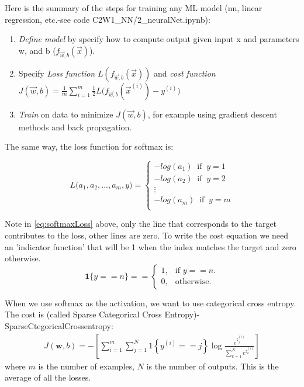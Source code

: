 \documentclass[12pt]{report}
\begin{document}
Here is the summary of the steps for training any ML model (nn, linear regression, etc.-see code C2W1\_NN/2\_neuralNet.ipynb):
\begin{enumerate}
  \item \textit{Define model} by specify how to compute output given input x and parameters w, and b ($f_{\overrightarrow{w},b} (\overrightarrow{x})$).
  \item Specify \textit{Loss function} $L (f_{\overrightarrow{w},b} (\overrightarrow{x}) )  $ and \textit{cost function} $J(\overrightarrow{w},b) = \frac{1}{m} \sum_{i=1}^{m} \frac{1}{2}  L\big(f_{\overrightarrow{w},b} (\overrightarrow{x}^{(i)}) - y^{(i)} \big)$
  \item \textit{Train} on data to minimize $J(\overrightarrow{w},b)$, for example using gradient descent methods and back propagation.
\end{enumerate}

The same way, the loss function for softmax is:

\begin{equation}
  L\big( a_1, a_2, ..., a_m, y \big) =
  \begin{cases}
    -log ( a_1 )  \;\; \text{if} \;\; y = 1  \\
    -log ( a_2 )  \;\; \text{if} \;\; y = 2  \\
    \vdots\\
    -log ( a_m )  \;\; \text{if} \;\; y = m  \\
  \end{cases}
  \label{eq:softmaxLoss}
\end{equation}

Note in \ref{eq:softmaxLoss} above, only the line that corresponds to the target contributes to the loss, other lines are zero. To write the cost equation we need an 'indicator function' that will be 1 when the index matches the target and zero otherwise.
$$\mathbf{1}\{y == n\} = =\begin{cases}
  1, & \text{if $y==n$}.\\
  0, & \text{otherwise}.
\end{cases}$$


When we use softmax as the activation, we want to use categorical cross entropy.
The cost is (called Sparse Categorical Cross Entropy)-SparseCtegoricalCrossentropy:
\begin{align}
  J(\mathbf{w},b) = - \left[ \sum_{i=1}^{m} \sum_{j=1}^{N}  1\left\{y^{(i)} == j\right\} \log \frac{e^{z^{(i)}_j}}{\sum_{k=1}^N e^{z^{(i)}_k} }\right] \tag{4}
\end{align}
where $m$ is the number of examples, $N$ is the number of outputs. This is the average of all the losses.
\end{document}
